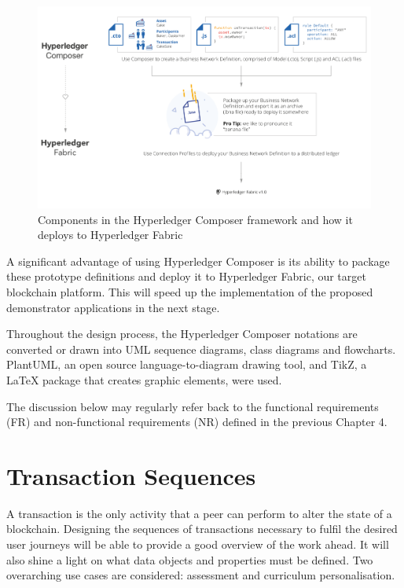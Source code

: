 \begin{figure}[!ht]
	\centering
	\includegraphics[width=1.0\textwidth]{composer2fabric}
	\caption[Hyperledger Composer]
	{Components in the Hyperledger Composer framework and how it deploys to
		Hyperledger Fabric \citep{cuicapuza2017composer}}
	\label{fig:composer2fabric}
\end{figure}

A significant advantage of using Hyperledger Composer is its ability to package these
prototype definitions and deploy it to Hyperledger Fabric, our target blockchain platform.
This will speed up the implementation of the proposed demonstrator applications
in the next stage.

Throughout the design process, the Hyperledger Composer notations are converted or drawn into UML sequence
diagrams, class diagrams and flowcharts. PlantUML, an open source language-to-diagram drawing tool, 
and TikZ, a LaTeX package that creates graphic elements, were used.

The discussion below may regularly refer back to the functional requirements (FR) and
non-functional requirements (NR) defined in the previous Chapter 4.

\section{Transaction Sequences}

A transaction is the only activity that a peer can perform to alter the state of a blockchain.
Designing the sequences of transactions necessary to fulfil the desired user journeys will
be able to provide a good overview of the work ahead. It will also shine a light on 
what data objects and properties must be defined. Two overarching use cases are considered:
assessment and curriculum personalisation.


